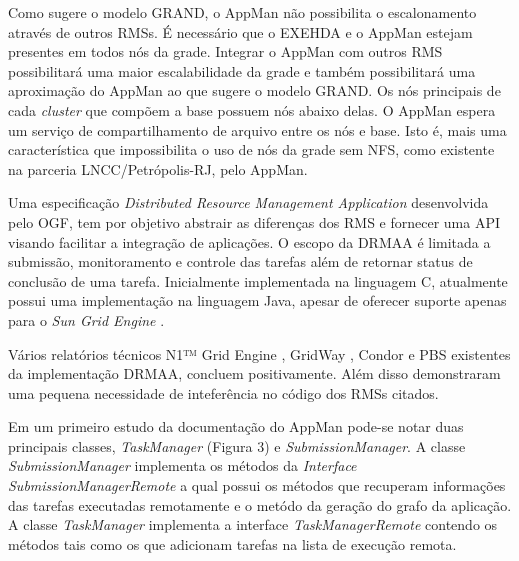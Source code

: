 Como sugere o modelo GRAND, o AppMan não possibilita o escalonamento através de outros RMSs. É necessário que o EXEHDA e o AppMan estejam presentes em todos nós da grade. Integrar o AppMan com outros RMS possibilitará uma maior escalabilidade da grade e também possibilitará uma aproximação do AppMan ao que sugere o modelo GRAND. Os nós principais de cada {\it cluster} que compõem a base possuem nós abaixo delas. O AppMan espera um serviço de compartilhamento de arquivo entre os nós e base. Isto é, mais uma característica que impossibilita o uso de nós da grade sem NFS, como existente na parceria LNCC/Petrópolis-RJ, pelo AppMan.

Uma especificação {\it Distributed Resource Management Application} \cite{Rajic2002} desenvolvida pelo OGF, tem por objetivo abstrair as diferenças dos RMS e fornecer uma API visando facilitar a integração de aplicações. O escopo da DRMAA é limitada a submissão, monitoramento e controle das tarefas além de retornar status de conclusão de uma tarefa. Inicialmente implementada na linguagem C, atualmente possui uma implementação na linguagem Java, apesar de oferecer suporte apenas para o {\it Sun Grid Engine} \cite{Templeton}.

Vários relatórios técnicos N1™ Grid Engine \cite{Templeton2006}, GridWay \cite{Herrera2007}, Condor \cite{Troeger2007} e PBS \cite{Ciesnik2007} existentes da implementação DRMAA, concluem positivamente. Além disso demonstraram uma pequena necessidade de inteferência no código dos RMSs citados.

Em um primeiro estudo da documentação do AppMan pode-se notar duas principais classes, {\it TaskManager} (Figura 3) e {\it SubmissionManager}. A classe {\it SubmissionManager} implementa os métodos da {\it Interface SubmissionManagerRemote} a qual possui os métodos que recuperam informações das tarefas executadas remotamente e o metódo da geração do grafo da aplicação. A classe {\it TaskManager } implementa a interface {\it TaskManagerRemote} contendo os métodos tais como os que adicionam tarefas na lista de execução remota.

